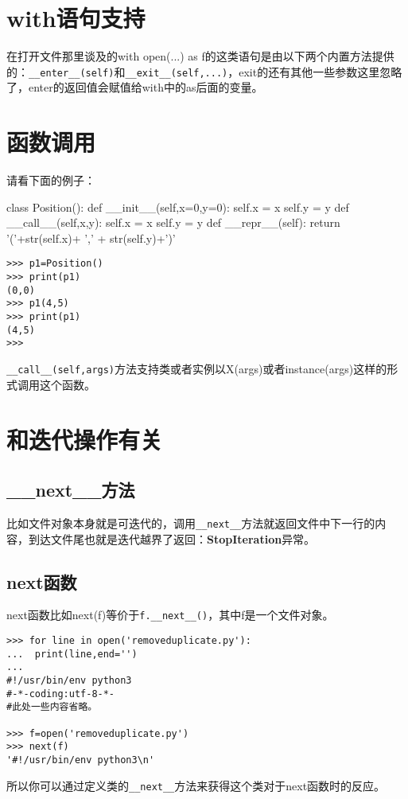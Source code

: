 \documentclass[12pt,oneside]{book}
\begin{document}
\begin{common-format}
\section{with语句支持}
在打开文件那里谈及的with open(...) as f的这类语句是由以下两个内置方法提供的：\verb+__enter__(self)+和\verb+__exit__(self,...)+，exit的还有其他一些参数这里忽略了，enter的返回值会赋值给with中的as后面的变量。

\section{函数调用}
请看下面的例子：
\begin{tcbpython}[]
class Position():
    def __init__(self,x=0,y=0):
        self.x = x
        self.y = y
    def __call__(self,x,y):
        self.x = x
        self.y = y
    def __repr__(self):
        return '('+str(self.x)+ ',' + str(self.y)+')'
\end{tcbpython}
\begin{Verbatim}
>>> p1=Position()
>>> print(p1)
(0,0)
>>> p1(4,5)
>>> print(p1)
(4,5)
>>> 
\end{Verbatim}
\verb+__call__(self,args)+方法支持类或者实例以X(args)或者instance(args)这样的形式调用这个函数。


\section{和迭代操作有关}
\subsection{\_{}\_{}next\_{}\_{}方法}
比如文件对象本身就是可迭代的，调用\verb+__next__+方法就返回文件中下一行的内容，到达文件尾也就是迭代越界了返回：\textbf{StopIteration}异常。

\subsection{next函数}
next函数比如next(f)等价于\verb+f.__next__()+，其中f是一个文件对象。

\begin{Verbatim}
>>> for line in open('removeduplicate.py'):
...  print(line,end='')
... 
#!/usr/bin/env python3
#-*-coding:utf-8-*-
#此处一些内容省略。
    
>>> f=open('removeduplicate.py')
>>> next(f)
'#!/usr/bin/env python3\n'
\end{Verbatim}

所以你可以通过定义类的\verb+__next__+方法来获得这个类对于next函数时的反应。



\end{common-format}
\end{document}
